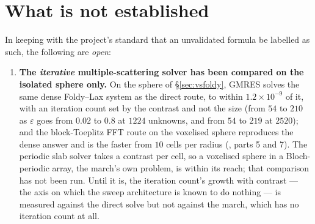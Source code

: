 \documentclass[11pt,a4paper]{article}
\begin{document}
\section{What is not established}\label{sec:open}

In keeping with the project's standard that an unvalidated formula be labelled
as such, the following are \emph{open}:

\begin{enumerate}
\item \textbf{The \emph{iterative} multiple-scattering solver has been
      compared on the isolated sphere only.}
      On the sphere of \S\ref{sec:vsfoldy}, GMRES solves the same dense
      Foldy--Lax system as the direct route, to within $1.2\times10^{-9}$ of it,
      with an iteration count set by the contrast and not the size (from $54$
      to $210$ as $\varepsilon$ goes from $0.02$ to $0.8$ at $1224$ unknowns, and
      from $54$ to $219$ at $2520$); and the block-Toeplitz FFT route on the voxelised sphere
      reproduces the dense answer and is the faster from $10$ cells per radius
      (, parts 5 and 7).  The
      periodic slab solver takes a contrast per cell, so a voxelised sphere in a
      Bloch-periodic array, the march's own problem, is within its reach; that
      comparison has not been run.  Until it is, the iteration count's growth
      with contrast --- the axis on which the sweep architecture is known to do
      nothing --- is measured against the direct solve but not against the
      march, which has no iteration count at all.


\end{enumerate}
\end{document}
